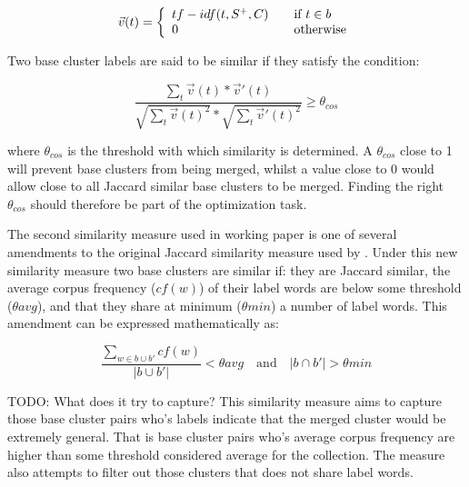 \begin{displaymath}
\vec{v}(t) = \left\{
  \begin{array}{l l}
    tf-idf(t, S^+, C) & \quad \text{if $t \in b$}\\
    0 & \quad \text{otherwise}
  \end{array} \right.
\end{displaymath}

Two base cluster labels are said to be similar if they satisfy the condition:

\begin{displaymath}
\frac{\sum_{t}\vec{v}(t) * \vec{v}'(t)}
{\sqrt{\sum_{t}\vec{v}(t)^2} * \sqrt{\sum_{t}\vec{v}'(t)^2}}
\ge \theta_{cos}
\end{displaymath}

where \(\theta_{cos}\) is the threshold with which similarity is determined. A \(\theta_{cos}\) close to 1 will prevent base clusters from being merged, whilst a value close to 0 would allow close to all Jaccard similar base clusters to be merged. Finding the right \(\theta_{cos}\) should therefore be part of the optimization task.

The second similarity measure used in \supervisor working paper is one of several amendments to the original Jaccard similarity measure used by \citeauthor{Oren1998}. Under this new similarity measure two base clusters are similar if: they are Jaccard similar, the average corpus frequency (\(cf(w)\)) of their label words are below some threshold (\(\theta avg\)), and that they share at minimum (\(\theta min\)) a number of label words. This amendment can be expressed mathematically as:

\begin{displaymath}
\frac{\sum\limits_{w \in b \cup b'} cf(w)}{\vert b \cup b' \vert} < \theta avg \quad \text{and} \quad \vert b \cap b' \vert > \theta min
\end{displaymath}

TODO: What does it try to capture?
This similarity measure aims to capture those base cluster pairs who's labels indicate that the merged cluster would be extremely general. That is base cluster pairs who's average corpus frequency are higher than some threshold considered average for the collection. The measure also attempts to filter out those clusters that does not share label words.
%



